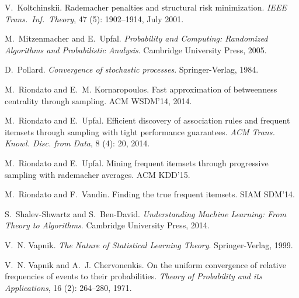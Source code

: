 \documentclass{sig-alternate-2013}
\begin{document}
\begin{thebibliography}{17}
V.~Koltchinskii.
\newblock Rademacher penalties and structural risk minimization.
\newblock \emph{IEEE Trans.~Inf.~Theory}, 47 (5): 1902--1914,
  July 2001.

M.~Mitzenmacher and E.~Upfal.
\newblock \emph{Probability and Computing: Randomized Algorithms and
  Probabilistic Analysis}.
\newblock Cambridge University Press, 2005.

D.~Pollard.
\newblock \emph{Convergence of stochastic processes}.
\newblock Springer-Verlag, 1984.

M.~Riondato and E.~M. Kornaropoulos.
\newblock Fast approximation of betweenness centrality through sampling.
\newblock ACM WSDM'14, 2014.

M.~Riondato and E.~Upfal.
\newblock Efficient discovery of association rules and frequent itemsets
  through sampling with tight performance guarantees.
\newblock \emph{ACM Trans. Knowl. Disc. from Data}, 8 (4):
  20, 2014.

M.~Riondato and E.~Upfal.
\newblock Mining frequent itemsets through progressive sampling with rademacher
  averages.
\newblock ACM KDD'15.

M.~Riondato and F.~Vandin.
\newblock Finding the true frequent itemsets.
\newblock SIAM SDM'14.

S.~Shalev-Shwartz and S.~Ben-David.
\newblock \emph{Understanding Machine Learning: From Theory to Algorithms}.
\newblock Cambridge University Press, 2014.

V.~N. Vapnik.
\newblock \emph{The Nature of Statistical Learning Theory}.
\newblock Springer-Verlag, 1999.

V.~N. Vapnik and A.~J. Chervonenkis.
\newblock On the uniform convergence of relative frequencies of events to their
  probabilities.
\newblock \emph{Theory of Probability and its Applications}, 16
  (2): 264--280, 1971.
\end{thebibliography}
\end{document}
